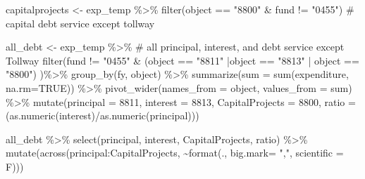 \documentclass[
  letterpaper,
  DIV=11,
  numbers=noendperiod]{scrreport}
\newenvironment{Shaded}{\begin{snugshade}}{\end{snugshade}}
\newcommand{\AttributeTok}[1]{\textcolor[rgb]{0.40,0.45,0.13}{#1}}
\newcommand{\CommentTok}[1]{\textcolor[rgb]{0.37,0.37,0.37}{#1}}
\newcommand{\ConstantTok}[1]{\textcolor[rgb]{0.56,0.35,0.01}{#1}}
\newcommand{\FunctionTok}[1]{\textcolor[rgb]{0.28,0.35,0.67}{#1}}
\newcommand{\NormalTok}[1]{\textcolor[rgb]{0.00,0.23,0.31}{#1}}
\newcommand{\OtherTok}[1]{\textcolor[rgb]{0.00,0.23,0.31}{#1}}
\newcommand{\SpecialCharTok}[1]{\textcolor[rgb]{0.37,0.37,0.37}{#1}}
\newcommand{\StringTok}[1]{\textcolor[rgb]{0.13,0.47,0.30}{#1}}
\begin{document}
\begin{Shaded}
\begin{Highlighting}[]
\NormalTok{capitalprojects }\OtherTok{\textless{}{-}}\NormalTok{ exp\_temp }\SpecialCharTok{\%\textgreater{}\%} 
  \FunctionTok{filter}\NormalTok{(object }\SpecialCharTok{==} \StringTok{"8800"} \SpecialCharTok{\&}\NormalTok{ fund }\SpecialCharTok{!=} \StringTok{"0455"}\NormalTok{) }\CommentTok{\# capital debt service except tollway}

\NormalTok{all\_debt }\OtherTok{\textless{}{-}}\NormalTok{ exp\_temp }\SpecialCharTok{\%\textgreater{}\%}     \CommentTok{\# all principal, interest, and debt service except Tollway}
  \FunctionTok{filter}\NormalTok{(fund }\SpecialCharTok{!=} \StringTok{"0455"} \SpecialCharTok{\&}\NormalTok{ (object }\SpecialCharTok{==} \StringTok{"8811"} \SpecialCharTok{|}\NormalTok{object }\SpecialCharTok{==} \StringTok{"8813"} \SpecialCharTok{|}\NormalTok{ object }\SpecialCharTok{==} \StringTok{"8800"}\NormalTok{) )}\SpecialCharTok{\%\textgreater{}\%} 
  \FunctionTok{group\_by}\NormalTok{(fy, object) }\SpecialCharTok{\%\textgreater{}\%} 
  \FunctionTok{summarize}\NormalTok{(}\AttributeTok{sum =} \FunctionTok{sum}\NormalTok{(expenditure, }\AttributeTok{na.rm=}\ConstantTok{TRUE}\NormalTok{)) }\SpecialCharTok{\%\textgreater{}\%} 
  \FunctionTok{pivot\_wider}\NormalTok{(}\AttributeTok{names\_from =}\NormalTok{ object, }\AttributeTok{values\_from =}\NormalTok{ sum) }\SpecialCharTok{\%\textgreater{}\%} 
  \FunctionTok{mutate}\NormalTok{(}\AttributeTok{principal =} \StringTok{\textasciigrave{}}\AttributeTok{8811}\StringTok{\textasciigrave{}}\NormalTok{,}
         \AttributeTok{interest =} \StringTok{\textasciigrave{}}\AttributeTok{8813}\StringTok{\textasciigrave{}}\NormalTok{,}
         \AttributeTok{CapitalProjects =} \StringTok{\textasciigrave{}}\AttributeTok{8800}\StringTok{\textasciigrave{}}\NormalTok{,}
         \AttributeTok{ratio =}\NormalTok{ (}\FunctionTok{as.numeric}\NormalTok{(interest)}\SpecialCharTok{/}\FunctionTok{as.numeric}\NormalTok{(principal)))}

\NormalTok{all\_debt }\SpecialCharTok{\%\textgreater{}\%} 
  \FunctionTok{select}\NormalTok{(principal, interest, CapitalProjects, ratio) }\SpecialCharTok{\%\textgreater{}\%}
  \FunctionTok{mutate}\NormalTok{(}\FunctionTok{across}\NormalTok{(principal}\SpecialCharTok{:}\NormalTok{CapitalProjects, }\SpecialCharTok{\textasciitilde{}}\FunctionTok{format}\NormalTok{(., }\AttributeTok{big.mark=} \StringTok{","}\NormalTok{, }\AttributeTok{scientific =}\NormalTok{ F)))}
\end{Highlighting}
\end{Shaded}
\end{document}
